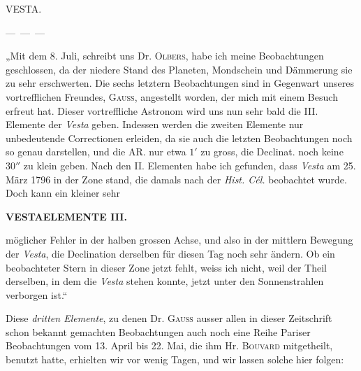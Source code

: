 \par{}\bigskip
\hypertarget{native-295-lower}{}
\begin{center}
\large VESTA.
\end{center}

\par\indent ---\ ---\ ---\par\nobreak\smallskip
\par\indent „Mit dem 8. Juli, schreibt uns Dr. \textsc{Olbers}, habe ich meine Beobachtungen geschlossen, da der
niedere Stand des Planeten, Mondschein und Dämmerung sie zu sehr erschwerten. Die sechs letztern
Beobachtungen sind in Gegenwart unseres vortrefflichen Freundes, \textsc{Gauss}, angestellt worden, der mich
mit einem Besuch erfreut hat. Dieser vortreffliche Astronom wird uns nun sehr bald die III. Elemente
der \emph{Vesta} geben. Indessen werden die zweiten Elemente nur unbedeutende Correctionen erleiden, da sie
auch die letzten Beobachtungen noch so genau darstellen, und die AR. nur etwa $1'$ zu gross, die Declinat.
noch keine $30''$ zu klein geben. Nach den II. Elementen habe ich gefunden, dass \emph{Vesta} am 25. März
1796 in der Zone stand, die damals nach der \emph{Hist. Cél.} beobachtet wurde. Doch kann ein kleiner sehr
\par\clearpage
\thispagestyle{empty}
\noindent{}%
\makebox[12mm][l]{}%
\parbox[t]{\dimexpr\linewidth-24mm\relax}{\centering\footnotesize\bfseries VESTA\quad ELEMENTE III.\par}%
\par\nobreak\medskip
\noindent möglicher Fehler in der halben grossen Achse, und also in der mittlern Bewegung der \emph{Vesta}, die Declination derselben für diesen Tag noch sehr ändern. Ob ein beobachteter Stern in dieser Zone jetzt fehlt,
weiss ich nicht, weil der Theil derselben, in dem die \emph{Vesta} stehen konnte, jetzt unter den Sonnenstrahlen verborgen ist.“

\par\indent Diese \emph{dritten Elemente}, zu denen Dr. \textsc{Gauss} ausser allen in dieser Zeitschrift schon bekannt gemachten Beobachtungen auch noch eine Reihe Pariser Beobachtungen vom 13. April bis 22. Mai, die ihm
Hr. \textsc{Bouvard} mitgetheilt, benutzt hatte, erhielten wir vor wenig Tagen, und wir lassen solche hier
folgen:

\smallskip


